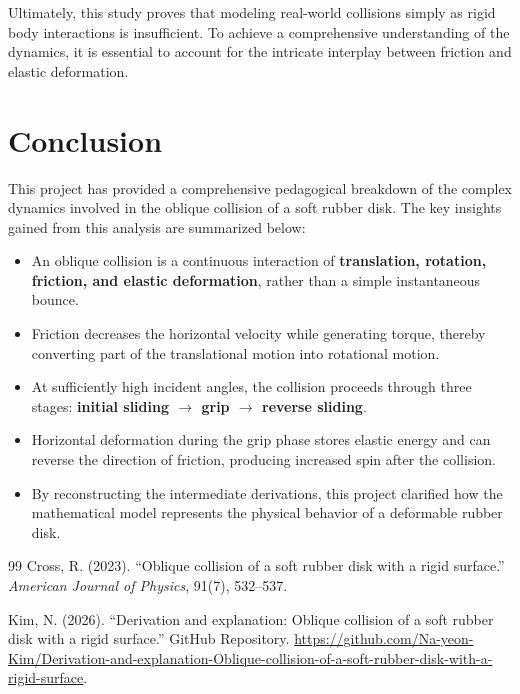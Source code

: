 \documentclass[11pt,letterpaper]{article}
\begin{document}
\noindent Ultimately, this study proves that modeling real-world collisions simply as rigid body interactions is insufficient. To achieve a comprehensive understanding of the dynamics, it is essential to account for the intricate interplay between friction and elastic deformation.

\section{Conclusion}
This project has provided a comprehensive pedagogical breakdown of the complex dynamics involved in the oblique collision of a soft rubber disk. The key insights gained from this analysis are summarized below:
\begin{itemize}
    \item An oblique collision is a continuous interaction of \textbf{translation, rotation, friction, and elastic deformation}, rather than a simple instantaneous bounce.
    \item Friction decreases the horizontal velocity while generating torque, thereby converting part of the translational motion into rotational motion.
    \item At sufficiently high incident angles, the collision proceeds through three stages: \textbf{initial sliding $\rightarrow$ grip $\rightarrow$ reverse sliding}.
    \item Horizontal deformation during the grip phase stores elastic energy and can reverse the direction of friction, producing increased spin after the collision.
    \item By reconstructing the intermediate derivations, this project clarified how the mathematical model represents the physical behavior of a deformable rubber disk.
\end{itemize}
\begin{thebibliography}{99}
\sloppy
Cross, R. (2023). ``Oblique collision of a soft rubber disk with a rigid surface.'' \textit{American Journal of Physics}, 91(7), 532--537.

Kim, N. (2026). ``Derivation and explanation: Oblique collision of a soft rubber disk with a rigid surface.'' GitHub Repository. \url{https://github.com/Na-yeon-Kim/Derivation-and-explanation-Oblique-collision-of-a-soft-rubber-disk-with-a-rigid-surface}.
\end{thebibliography}
\end{document}

